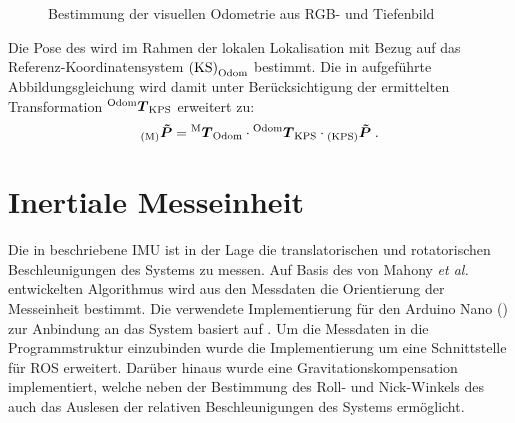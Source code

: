 \begin{figure}[!ht]
	\begin{center}
	\hspace{5mm}
	\caption{Bestimmung der visuellen Odometrie aus RGB- und Tiefenbild}
	\label{fig.fovis}
	\end{center}
\end{figure}

Die Pose des  wird im Rahmen der lokalen Lokalisation mit Bezug auf das Referenz-Koordinatensystem ${\mathrm{(KS)}}_{\mathrm{Odom}}$ bestimmt. Die in  aufgeführte Abbildungsgleichung wird damit unter Berücksichtigung der ermittelten Transformation ${^{\mathrm{Odom}}\mbox{\boldmath{$T$}}_{\mathrm{KPS}}}$ erweitert zu:
%
\begin{equation}
{_{{\mathrm{(M)}}}}\mbox{\boldmath{$\tilde{P}$}} = {^{\mathrm{M}}\mbox{\boldmath{$T$}}_{\mathrm{Odom}}} \cdot {^{\mathrm{Odom}}\mbox{\boldmath{$T$}}_{\mathrm{KPS}}} \cdot {_{{\mathrm{(KPS)}}}}\mbox{\boldmath{$\tilde{P}$}} \; \text{.}
\label{eq.locloc}
\end{equation}

\prever{
}
\prever{
}
\section{Inertiale Messeinheit}
Die in  beschriebene IMU ist in der Lage die translatorischen und rotatorischen Beschleunigungen des Systems zu messen. Auf Basis des von Mahony \textit{et al.} \cite{Mahony2008} entwickelten Algorithmus wird aus den Messdaten die Orientierung der Messeinheit bestimmt. Die verwendete Implementierung für den Arduino Nano () zur Anbindung an das System basiert auf \cite{IMUCode}. Um die Messdaten in die Programmstruktur einzubinden wurde die Implementierung um eine Schnittstelle für ROS erweitert. Darüber hinaus wurde eine Gravitationskompensation implementiert, welche neben der Bestimmung des Roll- und Nick-Winkels des  auch das Auslesen der relativen Beschleunigungen des Systems ermöglicht.\\

